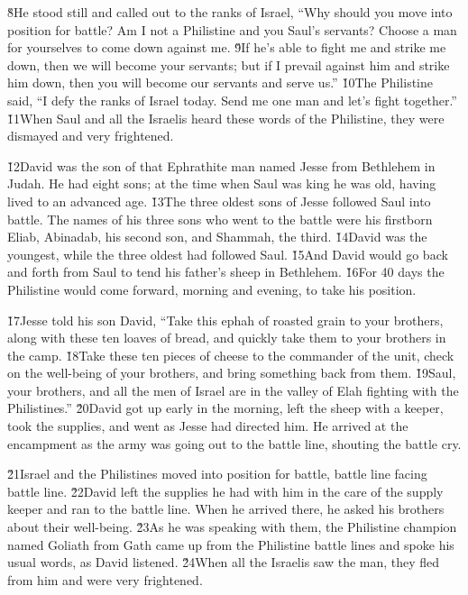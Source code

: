 \v{8}He stood still and called out to the ranks of Israel, ``Why should you move into position for battle? Am I not a Philistine and you Saul's servants? Choose a man for yourselves to come down against me. \v{9}If he's able to fight me and strike me down, then we will become your servants; but if I prevail against him and strike him down, then you will become our servants and serve us.'' \v{10}The Philistine said, ``I defy the ranks of Israel today. Send me one man and let's fight together.'' \v{11}When Saul and all the Israelis heard these words of the Philistine, they were dismayed and very frightened.

\v{12}David was the son of that Ephrathite man named Jesse from Bethlehem in Judah. He had eight sons; at the time when Saul was king he was old, having lived to an advanced age. \v{13}The three oldest sons of Jesse followed Saul into battle. The names of his three sons who went to the battle were his firstborn Eliab, Abinadab, his second son, and Shammah, the third. \v{14}David was the youngest, while the three oldest had followed Saul. \v{15}And David would go back and forth from Saul to tend his father's sheep in Bethlehem. \v{16}For 40 days the Philistine would come forward, morning and evening, to take his position.

\v{17}Jesse told his son David, ``Take this ephah of roasted grain to your brothers, along with these ten loaves of bread, and quickly take them to your brothers in the camp. \v{18}Take these ten pieces of cheese to the commander of the unit, check on the well-being of your brothers, and bring something back from them. \v{19}Saul, your brothers, and all the men of Israel are in the valley of Elah fighting with the Philistines.'' \v{20}David got up early in the morning, left the sheep with a keeper, took the supplies, and went as Jesse had directed him. He arrived at the encampment as the army was going out to the battle line, shouting the battle cry.

\v{21}Israel and the Philistines moved into position for battle, battle line facing battle line. \v{22}David left the supplies he had with him in the care of the supply keeper and ran to the battle line. When he arrived there, he asked his brothers about their well-being. \v{23}As he was speaking with them, the Philistine champion named Goliath from Gath came up from the Philistine battle lines and spoke his usual words, as David listened. \v{24}When all the Israelis saw the man, they fled from him and were very frightened.

